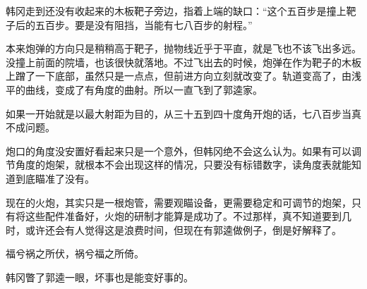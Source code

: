 韩冈走到还没有收起来的木板靶子旁边，指着上端的缺口：“这个五百步是撞上靶子后的五百步。要是没有阻挡，当能有七八百步的射程。”

本来炮弹的方向只是稍稍高于靶子，抛物线近乎于平直，就是飞也不该飞出多远。没撞上前面的院墙，也该很快就落地。不过飞出去的时候，炮弹在作为靶子的木板上蹭了一下底部，虽然只是一点点，但前进方向立刻就改变了。轨道变高了，由浅平的曲线，变成了有角度的曲射。所以一直飞到了郭逵家。

如果一开始就是以最大射距为目的，从三十五到四十度角开炮的话，七八百步当真不成问题。

炮口的角度没安置好看起来只是一个意外，但韩冈绝不会这么认为。如果有可以调节角度的炮架，就根本不会出现这样的情况，只要没有标错数字，读角度表就能知道到底瞄准了没有。

现在的火炮，其实只是一根炮管，需要观瞄设备，更需要稳定和可调节的炮架，只有将这些配件准备好，火炮的研制才能算是成功了。不过那样，真不知道要到几时，或许还会有人觉得这是浪费时间，但现在有郭逵做例子，倒是好解释了。

福兮祸之所伏，祸兮福之所倚。

韩冈瞥了郭逵一眼，坏事也是能变好事的。

